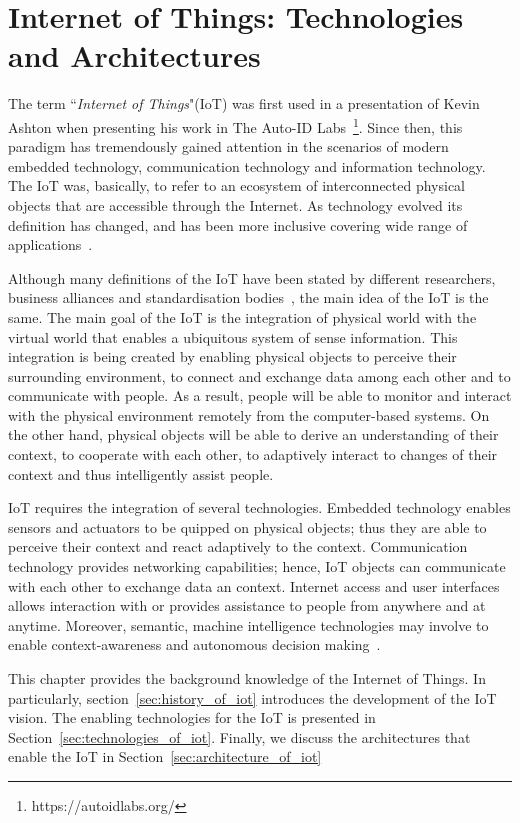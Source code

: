 \chapter{Internet of Things: Technologies and Architectures}
\label{ch:iot_tech_arch}

The term ``\textit{Internet of Things}"(IoT) was first used in a presentation of Kevin Ashton when presenting his work in The Auto-ID Labs~\footnote{https://autoidlabs.org/}. 
Since then, this paradigm has tremendously gained attention in the scenarios of modern embedded technology, communication technology and information technology.
The IoT was, basically, to refer to an ecosystem of interconnected physical objects that are accessible through the Internet.
As technology evolved its definition has changed, and has been more inclusive covering wide range of applications~\citep{Atzori:2017}. 


Although many definitions of the IoT have been stated by different researchers, business alliances and standardisation bodies~\citep{Minerva:2015}, the main idea of the IoT is the same.
The main goal of the IoT is the integration of physical world with the virtual world that enables a ubiquitous system of sense information.
This integration is being created by enabling physical objects to perceive their surrounding environment, to connect and exchange data among each other and to communicate with people.
As a result, people will be able to monitor and interact with the physical environment remotely from the computer-based systems.
On the other hand, physical objects will be able to derive an understanding of their context, to cooperate with each other, to adaptively interact to changes of their context and thus intelligently assist people.


IoT requires the integration of several technologies.
Embedded technology enables sensors and actuators to be quipped on physical objects; thus they are able to perceive their context and react adaptively to the context.
Communication technology provides networking capabilities; hence, IoT objects can communicate with each other to exchange data an context.
Internet access and user interfaces allows interaction with or provides assistance to people from anywhere and at anytime.
Moreover, semantic, machine intelligence technologies may involve to enable context-awareness and autonomous decision making~\citep{Vermesan:2018}. 

This chapter provides the background knowledge of the Internet of Things. In particularly, section~\ref{sec:history_of_iot} introduces the development of the IoT vision. The enabling technologies for the IoT is presented in Section~\ref{sec:technologies_of_iot}. Finally, we discuss the architectures that enable the IoT in Section~\ref{sec:architecture_of_iot}

